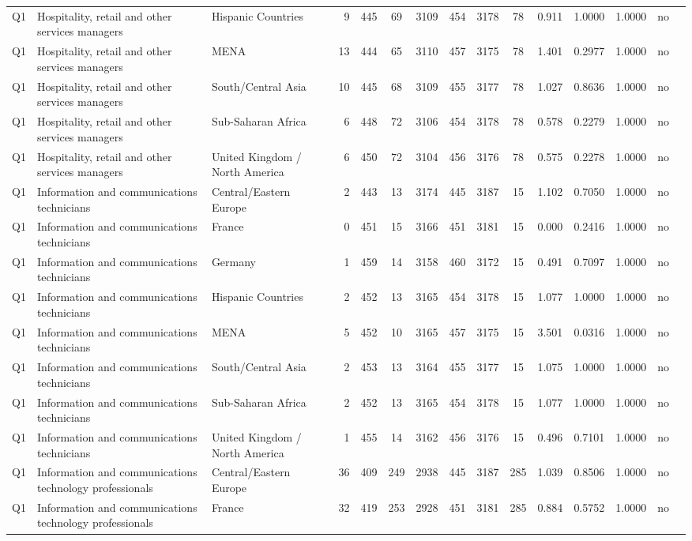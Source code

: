 \begin{longtable}{lllrcccccccccll}
Q1 & Hospitality, retail and other services managers & Hispanic Countries & 9 & 445 & 69 & 3109 & 454 & 3178 & 78 & 0.911 & 1.0000 & 1.0000 & no \\
Q1 & Hospitality, retail and other services managers & MENA & 13 & 444 & 65 & 3110 & 457 & 3175 & 78 & 1.401 & 0.2977 & 1.0000 & no \\
Q1 & Hospitality, retail and other services managers & South/Central Asia & 10 & 445 & 68 & 3109 & 455 & 3177 & 78 & 1.027 & 0.8636 & 1.0000 & no \\
Q1 & Hospitality, retail and other services managers & Sub-Saharan Africa & 6 & 448 & 72 & 3106 & 454 & 3178 & 78 & 0.578 & 0.2279 & 1.0000 & no \\
Q1 & Hospitality, retail and other services managers & United Kingdom / North America & 6 & 450 & 72 & 3104 & 456 & 3176 & 78 & 0.575 & 0.2278 & 1.0000 & no \\
Q1 & Information and communications technicians & Central/Eastern Europe & 2 & 443 & 13 & 3174 & 445 & 3187 & 15 & 1.102 & 0.7050 & 1.0000 & no \\
Q1 & Information and communications technicians & France & 0 & 451 & 15 & 3166 & 451 & 3181 & 15 & 0.000 & 0.2416 & 1.0000 & no \\
Q1 & Information and communications technicians & Germany & 1 & 459 & 14 & 3158 & 460 & 3172 & 15 & 0.491 & 0.7097 & 1.0000 & no \\
Q1 & Information and communications technicians & Hispanic Countries & 2 & 452 & 13 & 3165 & 454 & 3178 & 15 & 1.077 & 1.0000 & 1.0000 & no \\
Q1 & Information and communications technicians & MENA & 5 & 452 & 10 & 3165 & 457 & 3175 & 15 & 3.501 & 0.0316 & 1.0000 & no \\
Q1 & Information and communications technicians & South/Central Asia & 2 & 453 & 13 & 3164 & 455 & 3177 & 15 & 1.075 & 1.0000 & 1.0000 & no \\
Q1 & Information and communications technicians & Sub-Saharan Africa & 2 & 452 & 13 & 3165 & 454 & 3178 & 15 & 1.077 & 1.0000 & 1.0000 & no \\
Q1 & Information and communications technicians & United Kingdom / North America & 1 & 455 & 14 & 3162 & 456 & 3176 & 15 & 0.496 & 0.7101 & 1.0000 & no \\
Q1 & Information and communications technology professionals & Central/Eastern Europe & 36 & 409 & 249 & 2938 & 445 & 3187 & 285 & 1.039 & 0.8506 & 1.0000 & no \\
Q1 & Information and communications technology professionals & France & 32 & 419 & 253 & 2928 & 451 & 3181 & 285 & 0.884 & 0.5752 & 1.0000 & no \\

\end{longtable}
